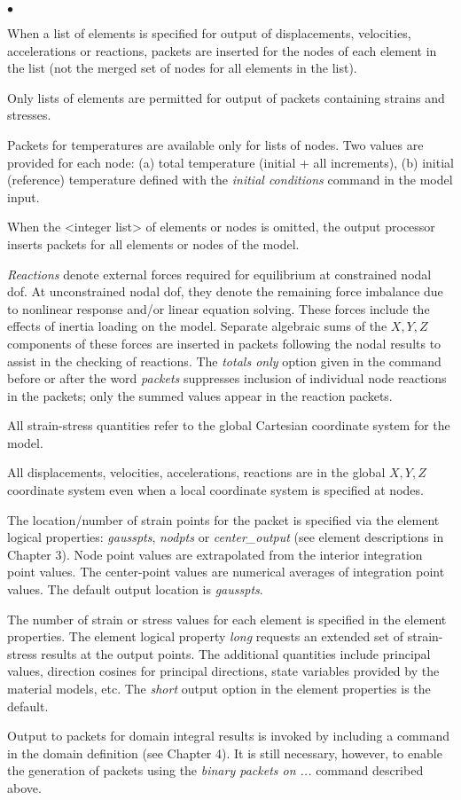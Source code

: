 \documentclass[11pt]{report}
\numberwithin{equation}{section}
\newcommand{\ti}{\emph}
\newcommand{\tl}{\textless\xspace}
\newcommand{\tg}{\textgreater\xspace}
\newcommand{\squishlist}{
 \begin{list}{$\bullet$}
  { \setlength{\itemsep}{0pt}
     \setlength{\parsep}{3pt}
     \setlength{\topsep}{3pt}
     \setlength{\partopsep}{0pt}
     \setlength{\leftmargin}{1.5em}
     \setlength{\labelwidth}{1em}
     \setlength{\labelsep}{0.5em} } }
\newcommand{\squishend}{
  \end{list}  }
\begin{document}
\small
\squishlist
\item When a list of elements is specified for output of displacements,
velocities, accelerations or reactions, packets are inserted for the nodes of
each element in the list (not the merged set of nodes for all elements in the
list). 
\item Only lists of elements are permitted for output of packets containing
strains and stresses. 
\item Packets for temperatures are available only for lists of nodes.
Two values are
provided for each node: (a) total temperature (initial + all increments),
(b) initial (reference) temperature defined with the \ti{initial conditions} command in
the model input.
\item When the \tl{integer list}\tg of elements or nodes is omitted, the output
processor inserts packets for all elements or nodes of the model.
\item \ti{Reactions} denote external forces required for equilibrium at constrained
nodal dof. At unconstrained nodal dof, they denote the remaining force imbalance
due to nonlinear response and/or linear equation solving. These forces include
the effects of inertia loading on the model. Separate algebraic sums of the $X, Y,
 Z$ components of these forces are inserted in packets following the nodal
results to assist in the checking of reactions. The \ti{totals only} option
given in the command before or after the word \ti{packets}
suppresses inclusion of individual node reactions in the packets; only the summed values
appear in the reaction packets.
\item All strain-stress quantities refer to the global Cartesian coordinate
system for the model. 
\item All displacements, velocities, accelerations, reactions are in the global
$X, Y, Z$ coordinate system even when a local coordinate system is specified at
nodes.
\item The location/number of strain points for the packet is specified via the element
logical properties: \ti{gausspts}, \ti{nodpts} or \ti{center\_output} (see element
descriptions in Chapter 3). Node point values are
extrapolated from the interior integration point values. The center-point values are numerical
averages of integration point values. The default output location is \ti{gausspts}.
\item The number of strain or stress values for each element is specified in the element
properties. The element logical property \ti{long} requests an extended
set of strain-stress results at the output points. The additional quantities
include principal values, direction cosines for principal directions, state variables provided
by the material models, etc. The \ti{short} output option in the element properties
is the default. 
\item Output to packets for domain integral results is invoked by including a
command in the domain definition (see Chapter 4). It is still necessary, however,
 to enable the generation of packets using the \ti{binary packets on ...}
 command described above.
\squishend
\normalsize
\end{document}
